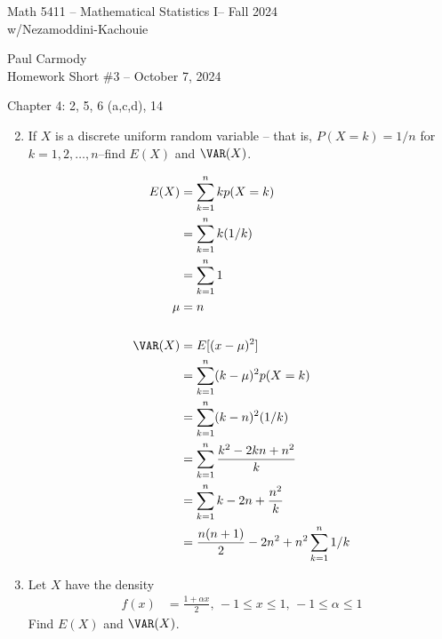 \documentclass[10pt,a4paper]{report}
\newcommand{\CLASSNAME}{Math 5411 -- Mathematical Statistics I}
\newcommand{\PROFESSOR}{Nezamoddini-Kachouie}
\newcommand{\STUDENTNAME}{Paul Carmody}
\newcommand{\ASSIGNMENT}{Homework Short \#3 }
\newcommand{\DUEDATE}{October 7, 2024}
\newcommand{\SEMESTER}{Fall 2024}
\newcommand{\BLUE}[1]{\textcolor{blue}{#1}}
\begin{document}
\begin{center}
	\Large{\CLASSNAME -- \SEMESTER} \\
	\large{w/\PROFESSOR}
\end{center}
\begin{center}
	\STUDENTNAME \\
	\ASSIGNMENT -- \DUEDATE\\
\end{center}

Chapter 4: 2, 5, 6 (a,c,d), 14
\begin{enumerate}
	\setcounter{enumi}{1}
	\item If $X$ is a discrete uniform random variable -- that is, $P(X=k)=1/n$ for $k=1,2,\dots,n$--find $E(X)$ and $\VAR(X)$.
	
	\BLUE{\begin{align*}
		E(X) &= \sum_{k=1}^n kp(X=k)\\
		&=  \sum_{k=1}^n k(1/k) \\
		&=  \sum_{k=1}^n 1 \\
		\mu &= n\\
		\\	
		\VAR(X) &= E[(x - \mu)^2]\\
		&=  \sum_{k=1}^n (k-\mu)^2p(X=k) \\
		&=  \sum_{k=1}^n (k-n)^2(1/k) \\
		&=  \sum_{k=1}^n \frac{k^2-2kn+n^2}{k} \\
		&=  \sum_{k=1}^n k-2n+\frac{n^2}{k} \\
		&= \frac{n(n+1)}{2} -2n^2+ n^2\sum_{k=1}^n 1/k 
	\end{align*} }
	\setcounter{enumi}{4}
	\newpage
	\item Let $X$ have the density 
	\begin{align*}
		f(x) &= \frac{1+\alpha x}{2}, \, -1 \le x \le 1, \, -1\le \alpha \le 1
	\end{align*}Find $E(X)$ and $\VAR(X)$.
	

\end{enumerate}
\end{document}
